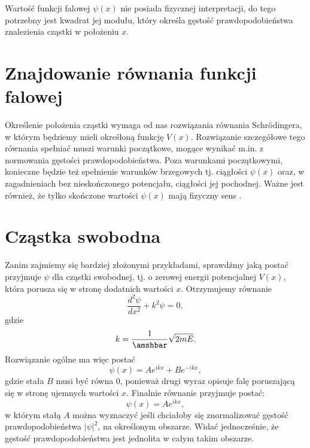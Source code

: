 \documentclass{SGGW-thesis}
\begin{document}
	Wartość funkcji falowej $\psi(x)$ nie posiada fizycznej interpretacji, do tego potrzebny jest kwadrat jej modułu, który określa gęstość prawdopodobieństwa znalezienia cząstki w położeniu $x$. 
	\section{Znajdowanie równania funkcji falowej}
	Określenie położenia cząstki wymaga od nas rozwiązania równania Schrödingera, w którym będziemy mieli określoną funkcję $V(x)$. Rozwiązanie szczegółowe tego równania spełniać muszi warunki początkowe, mogące wynikać m.in. z normowania gęstości prawdopodobieństwa. Poza warunkami początkowymi, konieczne będzie też spełnienie warunków brzegowych tj. ciągłości $\psi(x)$ oraz, w zagadnieniach bez nieskończonego potencjału, ciągłości jej pochodnej. Ważne jest również, że tylko skończone wartości $\psi(x)$ mają fizyczny sens \cite{fiz atom}.
	
	\section{Cząstka swobodna}
	Zanim zajmiemy się bardziej złożonymi przykładami, sprawdźmy jaką postać przyjmuje $\psi$ dla cząstki swobodnej, tj. o zerowej energii potencjalnej $V(x)$, która porusza się w stronę dodatnich wartości $x$. Otrzymujemy równanie 
	\begin{equation}\label{eqn:free-particle-schrodigner}
	\frac{d^2\psi}{dx^2}+k^2\psi=0,
	\end{equation}
gdzie
	\begin{equation}
	k=\frac{1}{\amshbar}\sqrt{2mE}.
	\end{equation}
Rozwiązanie ogólne ma więc postać
	\begin{equation}\label{eqn:free-particle-gen-solution}
	\psi(x)=Ae^{ikx} + Be^{-ikx},
	\end{equation}
gdzie stała $B$ musi być równa 0, ponieważ drugi wyraz opisuje falę poruszającą się w stronę ujemnych wartości $x$. Finalnie równanie przyjmuje postać:
	\begin{equation}\label{eqn:free-particle-solution}
	\psi(x) = Ae^{ikx},
	\end{equation}
w którym stałą $A$ można wyznaczyć jeśli chciałoby się znormalizować gęstość prawdopodobieństwa $|\psi|^2$, na określonym obszarze. Widać jednocześnie, że gęstość prawdopodobieństwa jest jednolita w całym takim obszarze.
	
\end{document}
